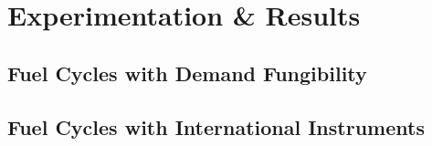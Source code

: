 \section{Experimentation \& Results}

\subsection{Fuel Cycles with Demand Fungibility}





\subsection{Fuel Cycles with International Instruments}





